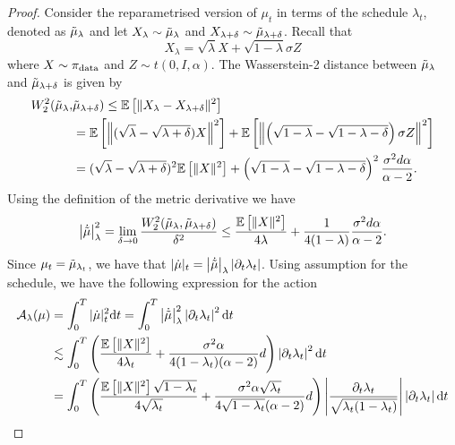 \begin{proof}
Consider the reparametrised version of $\mu_t$ in terms of the schedule $\lambda_t$, denoted as $\Tilde{\mu}_\lambda$ and let $X_{\lambda}\sim\Tilde{\mu}_{\lambda}$ and $X_{\lambda + \delta}\sim\Tilde{\mu}_{\lambda + \delta}$.
Recall that 
\begin{equation*}
    X_{\lambda} = \sqrt{\lambda} X + \sqrt{1-\lambda}\sigma Z
\end{equation*}
where $X\sim\operatorname*{\pi_{\text{data}}}$ and $Z\sim t(0, I, \alpha)$.  The Wasserstein-2 distance between $\Tilde{\mu}_\lambda$ and $\Tilde{\mu}_{\lambda+\delta}$ is given by
\begin{align*}
     W_2^2(\Tilde{\mu}_\lambda, &\Tilde{\mu}_{\lambda+\delta}) \leq \mathbb{E}\left[\Vert X_\lambda-X_{\lambda + \delta}\Vert^2\right]\\
&=\mathbb{E}\left[\left\Vert(\sqrt{\lambda}-\sqrt{\lambda+\delta})X\right\Vert^2\right] + \mathbb{E}\left[\left\Vert\left(\sqrt{1-\lambda}-\sqrt{1-\lambda-\delta}\right)\sigma Z\right\Vert^2\right]\\
&= (\sqrt{\lambda}-\sqrt{\lambda+\delta})^2 \mathbb{E}\left[\Vert X\Vert^2\right] + \left(\sqrt{1-\lambda}-\sqrt{1-\lambda-\delta}\right)^2 \frac{\sigma^2d\alpha}{\alpha -2}.
\end{align*}
Using the definition of the metric derivative we have
\begin{align*}
    \left\vert\Dot{\Tilde{\mu}}\right\vert_\lambda^2 = \lim_{\delta\to 0}\frac{ W_2^2(\Tilde{\mu}_\lambda, \Tilde{\mu}_{\lambda+\delta})}{\delta^2} \leq \frac{\mathbb{E}\left[\Vert X\Vert^2\right]}{4\lambda} + \frac{1}{4(1-\lambda)}\frac{\sigma^2 d\alpha}{\alpha-2}.
\end{align*}
Since $\mu_t = \Tilde{\mu}_{\lambda_t}$, we have that $\vert\Dot{\mu}\vert_t = \left\vert\Dot{\Tilde{\mu}}\right\vert_\lambda\left\vert\partial_t{\lambda_t}\right\vert$. Using assumption  for the schedule, we have the following expression for the action
\begin{align}
    \mathcal{A}_{\lambda}(\mu) &= \int_0^T \vert\Dot{\mu}\vert_t^2 \md t = \int_0^T \left\vert\Dot{\Tilde{\mu}}\right\vert_\lambda^2\left\vert\partial_t{\lambda_t}\right\vert^2 \md t\nonumber\\
    &\lesssim \int_0^T \left(\frac{\mathbb{E}\left[\Vert X\Vert^2\right]}{4 \lambda_t} + \frac{\sigma^2\alpha}{4(1-\lambda_t)(\alpha-2)}d\right)\left\vert \partial_t{\lambda_t}\right\vert^2\md t \nonumber\\
    &= \int_0^T \left(\frac{\mathbb{E}\left[\Vert X\Vert^2\right]\sqrt{1-\lambda_t}}{4\sqrt{\lambda_t}} + \frac{\sigma^2\alpha\sqrt{\lambda_t}}{4\sqrt{1-\lambda_t}(\alpha-2)}d\right)\left\vert \frac{\partial_t{\lambda_t}}{\sqrt{\lambda_t(1-\lambda_t)}}\right\vert \left\vert \partial_t{\lambda_t}\right\vert\md t \nonumber\\    

\end{align}
\end{proof}
